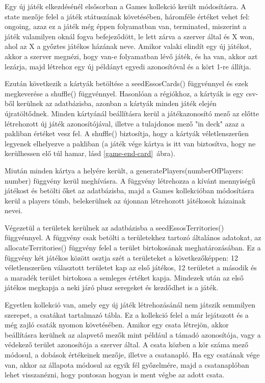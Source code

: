 \documentclass[
]{thesis-ekf}
\theoremstyle{definition}
\theoremstyle{remark}
\begin{document}
	
	
	Egy új játék elkezdésénél elsősorban a Games kollekció került módosításra. A state mezője felel a játék státuszának követésében, háromféle értéket vehet fel: ongoing, azaz ez a játék még éppen folyamatban van, terminated, miszerint a játék valamilyen oknál fogva befejeződött, le lett zárva a szerver által és X won, ahol az X a győztes játékos házának neve. Amikor valaki elindít egy új játékot, akkor a szerver megnézi, hogy van-e folyamatban lévő játék, és ha van, akkor azt lezárja, majd létrehoz egy új példányt egyedi azonosítóval és a kört 1-re állítja.
	
	Ezután következik a kártyák betöltése a seedEssosCards() függvénnyel és ezek megkeverése a shuffle() függvénnyel. Hasonlóan a régiókhoz, a kártyák is egy csv-ből kerülnek az adatbázisba, azonban a kártyák minden játék elején újratöltődnek. Minden kártyánál beállításra kerül a játékazonosító mező az előtte létrehozott új játék azonosítójával, illetve a tulajdonos mező "in deck" azaz a pakliban értéket vesz fel. A shuffle() biztosítja, hogy a kártyák véletlenszerűen legyenek elhelyezve a pakliban (a játék vége kártya is itt van biztosítva, hogy ne kerülhessen elő túl hamar, lásd \ref{game-end-card}~ábra).
	
	
	
	Miután minden kártya a helyére került, a generatePlayers(numberOfPlayers: number) függvény kerül meghívásra. A függvény létrehozza a kívánt mennyiségű játékost és betölti őket az adatbázisba, majd a Games kollekcióban módosításra kerül a players tömb, belekerülnek az újonnan létrehozott játékosok házainak nevei.
	
	Végezetül a területek kerülnek az adatbázisba a seedEssosTerritories() függvénnyel. A függvény csak betölti a területekhez tartozó általános adatokat, az allocateTerritories() függvény felel a terület birtokosának meghatározásában. Ez a függvény két játékos között osztja szét a területeket a következőképpen: 12 véletlenszerűen választott területet kap az első játékos, 12 területet a második és a maradék terület birtokosa a semleges értéket kapja. Mindezek után az első játékos megkapja a neki járó plusz seregeket és kezdődhet is a játék.
	
	Egyetlen kollekció van, amely egy új játék létrehozásánál nem játszik semmilyen szerepet, a csatákat tartalmazó tábla. Ez a kollekció felel a már lejátszott és a még zajló csaták nyomon követésében. Amikor egy csata létrejön, akkor beállításra kerülnek az alapvető mezők mint például a támadó azonosítója, vagy a védekező terület azonosítója a szerver által. A csata közben a kör száma mező módosul, a dobások értékeinek mezője, illetve a csatanapló. Ha egy csatának vége van, akkor az állapota módosul az egyik fél győzelmére, majd a csatanaplóban lehet visszanézni, hogy pontosan hogyan is ment végbe az adott csata.
	
\end{document}

